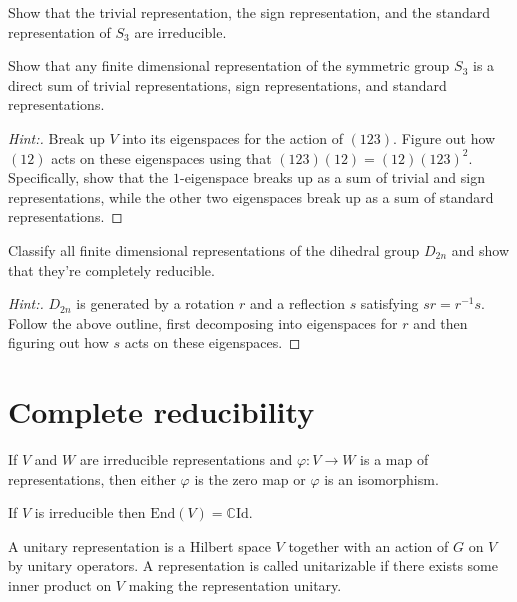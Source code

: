 \documentclass[11pt]{article}
\begin{document}
\begin{exercise}
Show that the trivial representation, the sign representation, and the standard representation of $S_3$ are irreducible.
\end{exercise}

\begin{exercise}
Show that any finite dimensional representation of the symmetric group $S_3$ is a direct sum of trivial representations, sign representations, and standard representations.
\end{exercise}
\begin{proof}[Hint:]
Break up $V$ into its eigenspaces for the action of $(123)$.  Figure out how $(12)$ acts on these eigenspaces using that $(123)(12) = (12)(123)^2$.  Specifically, show that the $1$-eigenspace breaks up as a sum of trivial and sign representations, while the other two eigenspaces break up as a sum of standard representations.
\end{proof}

\begin{exercise}
Classify all finite dimensional representations of the dihedral group $D_{2n}$ and show that they're completely reducible.
\end{exercise}
\begin{proof}[Hint:]
$D_{2n}$ is generated by a rotation $r$ and a reflection $s$ satisfying $s r = r^{-1} s$.  Follow the above outline, first decomposing into eigenspaces for $r$ and then figuring out how $s$ acts on these eigenspaces.
\end{proof}

\section{Complete reducibility}

\begin{exercise}
If $V$ and $W$ are irreducible representations and $\varphi: V \rightarrow W$ is a map of representations, then either $\varphi$ is the zero map or $\varphi$ is an isomorphism.

If $V$ is irreducible then $\mathrm{End}(V) = \mathbb{C} \mathrm{Id}$. 
\end{exercise}

\begin{definition}
A unitary representation is a Hilbert space $V$ together with an action of $G$ on $V$ by unitary operators.  A representation is called unitarizable if there exists some inner product on $V$ making the representation unitary.
\end{definition}
\end{document}
